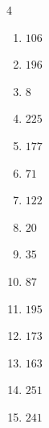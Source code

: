 \begin{multicols}{4}
\begin{enumerate}
  \item $106$


  \item $196$


  \item $8$


  \item $225$


  \item $177$


\columnbreak %

\resetques

  \item $71$


  \item $122$


  \item $20$


  \item $35$


  \item $87$


  \item $195$


  \item $173$


  \item $163$


  \item $251$


  \item $241$



\end{enumerate}
\end{multicols}
